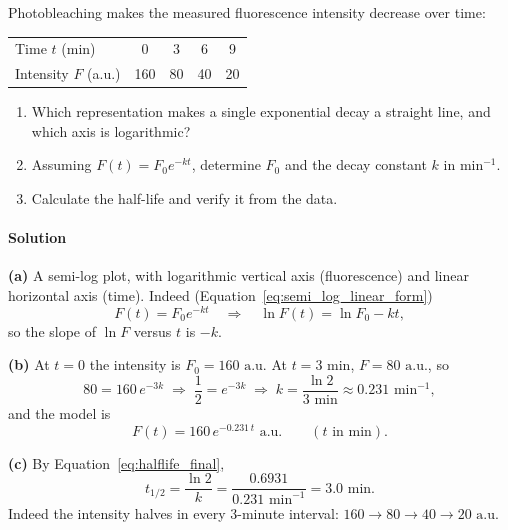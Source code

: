 Photobleaching makes the measured fluorescence intensity decrease over time:
\begin{center}
\begin{tabular}{lcccc}
\toprule
Time $t$ (min) & 0 & 3 & 6 & 9 \\
Intensity $F$ (a.u.) & 160 & 80 & 40 & 20 \\
\bottomrule
\end{tabular}
\end{center}
\begin{enumerate}[label=(\alph*)]
    \item Which representation makes a single exponential decay a straight line, and which axis is logarithmic?
    \item Assuming $F(t) = F_0e^{-kt}$, determine $F_0$ and the decay constant $k$ in $\text{min}^{-1}$.
    \item Calculate the half-life and verify it from the data.
\end{enumerate}

\paragraph{Solution} \textbf{(a)} A semi-log plot, with logarithmic vertical axis (fluorescence) and linear horizontal axis (time). Indeed (Equation~\eqref{eq:semi_log_linear_form})
\begin{equation*}
F(t) = F_0e^{-kt} \quad \Longrightarrow \quad \ln F(t) = \ln F_0 - kt,
\end{equation*}
so the slope of $\ln F$ versus $t$ is $-k$.

\textbf{(b)} At $t = 0$ the intensity is $F_0 = 160\text{ a.u.}$ At $t = 3\text{ min}$, $F = 80\text{ a.u.}$, so
\begin{equation*}
80 = 160\,e^{-3k} \;\Longrightarrow\; \frac{1}{2} = e^{-3k} \;\Longrightarrow\; k = \frac{\ln 2}{3\text{ min}} \approx 0.231\text{ min}^{-1},
\end{equation*}
and the model is
\begin{equation*}
F(t) = 160\,e^{-0.231\,t}\text{ a.u.} \qquad (t \text{ in min}).
\end{equation*}

\textbf{(c)} By Equation~\eqref{eq:halflife_final},
\begin{equation*}
t_{1/2} = \frac{\ln 2}{k} = \frac{0.6931}{0.231\text{ min}^{-1}} = 3.0\text{ min}.
\end{equation*}
Indeed the intensity halves in every 3-minute interval: $160 \to 80 \to 40 \to 20\text{ a.u.}$

